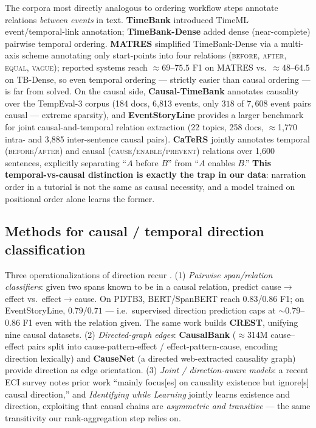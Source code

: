 The corpora most directly analogous to ordering workflow steps annotate
relations \emph{between events} in text. \textbf{TimeBank}
\citep{caus:pustejovsky2003timebank} introduced TimeML event/temporal-link
annotation; \textbf{TimeBank-Dense} \citep{caus:cassidy2014timebankdense} added
dense (near-complete) pairwise temporal ordering. \textbf{MATRES}
\citep{caus:ning2018matres} simplified TimeBank-Dense via a multi-axis scheme
annotating only start-points into four relations (\textsc{before}, \textsc{after},
\textsc{equal}, \textsc{vague}); reported systems reach $\approx$$69$--$75.5$ F1
on MATRES vs.\ $\approx$$48$--$64.5$ on TB-Dense, so even temporal ordering ---
strictly easier than causal ordering --- is far from solved. On the causal side,
\textbf{Causal-TimeBank} \citep{caus:mirza2014causaltimebank} annotates causality
over the TempEval-3 corpus (184 docs, 6,813 events, only $318$ of $7{,}608$ event
pairs causal --- extreme sparsity), and \textbf{EventStoryLine}
\citep{caus:caselli2017eventstoryline} provides a larger benchmark for joint
causal-and-temporal relation extraction (22 topics, 258 docs, $\approx$1,770
intra- and 3,885 inter-sentence causal pairs). \textbf{CaTeRS}
\citep{caus:mostafazadeh2016caters} jointly annotates temporal
(\textsc{before}/\textsc{after}) and causal (\textsc{cause}/\textsc{enable}/\textsc{prevent})
relations over 1,600 sentences, explicitly separating ``$A$ before $B$'' from
``$A$ enables $B$.'' \textbf{This temporal-vs-causal distinction is exactly the
trap in our data}: narration order in a tutorial is not the same as causal
necessity, and a model trained on positional order alone learns the former.

\subsection{Methods for causal / temporal direction classification}
\label{sec:methods}

Three operationalizations of direction recur \citep{caus:hosseini2021directionality}.
(1) \emph{Pairwise span/relation classifiers}: given two spans known to be in a
causal relation, predict cause$\to$effect vs.\ effect$\to$cause. On PDTB3,
BERT/SpanBERT reach $0.83$/$0.86$ F1; on EventStoryLine, $0.79$/$0.71$ ---
i.e.\ supervised direction prediction caps at $\sim$$0.79$--$0.86$ F1 even with
the relation given. The same work builds \textbf{CREST}, unifying nine causal
datasets. (2) \emph{Directed-graph edges}: \textbf{CausalBank}
\citep{caus:li2020causalbank} ($\approx$314M cause--effect pairs split into
cause-pattern-effect / effect-pattern-cause, encoding direction lexically) and
\textbf{CauseNet} \citep{caus:heindorf2020causenet} (a directed web-extracted
causality graph) provide direction as edge orientation. (3) \emph{Joint /
direction-aware models}: a recent ECI survey \citep{caus:eciSurvey2024} notes
prior work ``mainly focus[es] on causality existence but ignore[s] causal
direction,'' and \emph{Identifying while Learning}
\citep{caus:identifyingwhilelearning2024} jointly learns existence and direction,
exploiting that causal chains are \emph{asymmetric and transitive} --- the same
transitivity our rank-aggregation step relies on.

